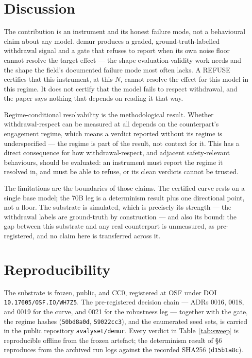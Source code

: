 \documentclass{article}
\begin{document}
\section{Discussion}

The contribution is an instrument and its honest failure mode, not a behavioural claim about any model. demur produces a graded, ground-truth-labelled withdrawal signal and a gate that refuses to report when its own noise floor cannot resolve the target effect --- the shape evaluation-validity work needs and the shape the field's documented failure mode most often lacks. A REFUSE certifies that this instrument, at this $N$, cannot resolve the effect for this model in this regime. It does not certify that the model fails to respect withdrawal, and the paper says nothing that depends on reading it that way.

Regime-conditional resolvability is the methodological result. Whether withdrawal-respect can be measured at all depends on the counterpart's engagement regime, which means a verdict reported without its regime is underspecified --- the regime is part of the result, not context for it. This has a direct consequence for how withdrawal-respect, and adjacent safety-relevant behaviours, should be evaluated: an instrument must report the regime it resolved in, and must be able to refuse, or its clean verdicts cannot be trusted.

The limitations are the boundaries of those claims. The certified curve rests on a single base model; the 70B leg is a determinism result plus one directional point, not a floor. The substrate is simulated, which is precisely its strength --- the withdrawal labels are ground-truth by construction --- and also its bound: the gap between this substrate and any real counterpart is unmeasured, as pre-registered, and no claim here is transferred across it.

\section{Reproducibility}

The substrate is frozen, public, and CC0, registered at OSF under DOI \texttt{10.17605/OSF.IO/WH7Z5}. The pre-registered decision chain --- ADRs 0016, 0018, and 0019 for the curve, and 0021 for the robustness leg --- together with the gate, the regime hashes (\texttt{50bd8a0d}, \texttt{59022cc3}), and the enumerated seed sets, is carried in the public repository \texttt{avalyset/demur}. Every verdict in Table~\ref{tab:sweep} is reproducible offline from the frozen artefact; the determinism result of §6 reproduces from the archived run logs against the recorded SHA256 (\texttt{d15b1a8c}).



\end{document}
